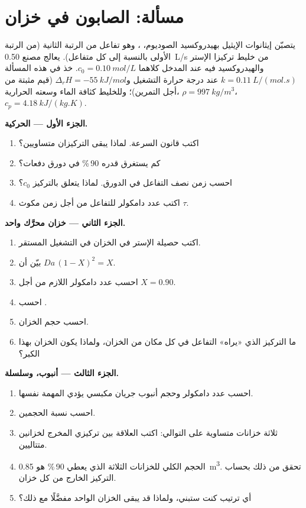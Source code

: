 \section{مسألة: الصابون في خزان}

\begin{problem}
\label{pb:b2:continuous-reactors:1}
يتصبّن إيثانوات الإيثيل بهيدروكسيد الصوديوم،
، وهو تفاعل من الرتبة الثانية (من
الرتبة الأولى بالنسبة إلى كل متفاعل). يعالج مصنع \qty{0.50}{L/s} من خليط
تركيزا الإستر والهيدروكسيد فيه عند المدخل كلاهما $c_0 =
\qty{0.10}{mol/L}$. خذ في هذه المسألة $k = \qty{0.11}{L/(mol.s)}$ عند
درجة حرارة التشغيل و$\Delta_r H = \qty{-55}{kJ/mol}$ (قيم مثبتة من أجل
التمرين)؛ وللخليط كثافة الماء وسعته الحرارية،
$\rho = \qty{997}{kg/m^3}$، $c_p = \qty{4.18}{kJ/(kg.K)}$.

\medskip
\noindent\textbf{الجزء الأول --- الحركية.}
\begin{enumerate}
  \item اكتب قانون السرعة. لماذا يبقى التركيزان متساويين؟
  \item كم يستغرق  قدره 90\,\% في دورق دفعات؟
  \item احسب زمن نصف التفاعل في الدورق. لماذا يتعلق بالتركيز $c_0$؟
  \item اكتب عدد دامكولر للتفاعل من أجل زمن مكوث $\tau$.
\end{enumerate}

\medskip
\noindent\textbf{الجزء الثاني --- خزان محرَّك واحد.}
\begin{enumerate}[resume]
  \item اكتب حصيلة الإستر في الخزان في التشغيل المستقر.
  \item بيّن أن $Da\,(1 - X)^2 = X$.
  \item احسب عدد دامكولر اللازم من أجل $X = 0.90$.
  \item احسب .
  \item احسب حجم الخزان.
  \item ما التركيز الذي «يراه» التفاعل في كل مكان من الخزان،
        ولماذا يكون الخزان بهذا الكبر؟
\end{enumerate}

\medskip
\noindent\textbf{الجزء الثالث --- أنبوب، وسلسلة.}
\begin{enumerate}[resume]
  \item احسب عدد دامكولر وحجم أنبوب جريان مكبسي يؤدي
        المهمة نفسها.
  \item احسب نسبة الحجمين.
  \item ثلاثة خزانات متساوية على التوالي: اكتب العلاقة بين تركيزي المخرج
        لخزانين متتاليين.
  \item الحجم الكلي للخزانات الثلاثة الذي يعطي 90\,\% هو
        \qty{0.85}{m^3}. تحقق من ذلك بحساب التركيز الخارج من كل
        خزان.
  \item أي ترتيب كنت ستبني، ولماذا قد يبقى الخزان الواحد
        مفضَّلًا مع ذلك؟
\end{enumerate}


\end{problem}
